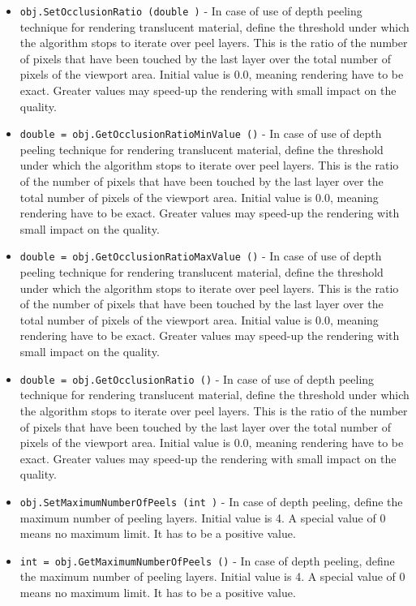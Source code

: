 \begin{itemize}
\item  \verb|obj.SetOcclusionRatio (double )| -  In case of use of depth peeling technique for rendering translucent
 material, define the threshold under which the algorithm stops to
 iterate over peel layers. This is the ratio of the number of pixels
 that have been touched by the last layer over the total number of pixels
 of the viewport area.
 Initial value is 0.0, meaning rendering have to be exact. Greater values
 may speed-up the rendering with small impact on the quality.

\item  \verb|double = obj.GetOcclusionRatioMinValue ()| -  In case of use of depth peeling technique for rendering translucent
 material, define the threshold under which the algorithm stops to
 iterate over peel layers. This is the ratio of the number of pixels
 that have been touched by the last layer over the total number of pixels
 of the viewport area.
 Initial value is 0.0, meaning rendering have to be exact. Greater values
 may speed-up the rendering with small impact on the quality.

\item  \verb|double = obj.GetOcclusionRatioMaxValue ()| -  In case of use of depth peeling technique for rendering translucent
 material, define the threshold under which the algorithm stops to
 iterate over peel layers. This is the ratio of the number of pixels
 that have been touched by the last layer over the total number of pixels
 of the viewport area.
 Initial value is 0.0, meaning rendering have to be exact. Greater values
 may speed-up the rendering with small impact on the quality.

\item  \verb|double = obj.GetOcclusionRatio ()| -  In case of use of depth peeling technique for rendering translucent
 material, define the threshold under which the algorithm stops to
 iterate over peel layers. This is the ratio of the number of pixels
 that have been touched by the last layer over the total number of pixels
 of the viewport area.
 Initial value is 0.0, meaning rendering have to be exact. Greater values
 may speed-up the rendering with small impact on the quality.

\item  \verb|obj.SetMaximumNumberOfPeels (int )| -  In case of depth peeling, define the maximum number of peeling layers.
 Initial value is 4. A special value of 0 means no maximum limit.
 It has to be a positive value.

\item  \verb|int = obj.GetMaximumNumberOfPeels ()| -  In case of depth peeling, define the maximum number of peeling layers.
 Initial value is 4. A special value of 0 means no maximum limit.
 It has to be a positive value.


\end{itemize}
